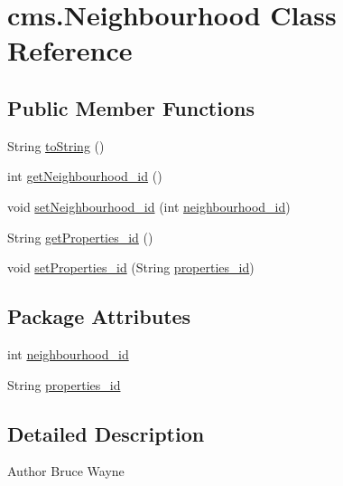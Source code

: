 \hypertarget{classcms_1_1_neighbourhood}{}\section{cms.\+Neighbourhood Class Reference}
\label{classcms_1_1_neighbourhood}
\subsection*{Public Member Functions}
\begin{DoxyCompactItemize}
\item 
String \mbox{\hyperlink{classcms_1_1_neighbourhood_a48841e05711991f412c2a28cb541a9be}{to\+String}} ()
\item 
int \mbox{\hyperlink{classcms_1_1_neighbourhood_a01357608cd45e4bcbe1668bdd25b8fe3}{get\+Neighbourhood\+\_\+id}} ()
\item 
void \mbox{\hyperlink{classcms_1_1_neighbourhood_a5223265e896fc8f18444fdb09cedb640}{set\+Neighbourhood\+\_\+id}} (int \mbox{\hyperlink{classcms_1_1_neighbourhood_a8c177196de739fc0f3f68c3865c6fabf}{neighbourhood\+\_\+id}})
\item 
String \mbox{\hyperlink{classcms_1_1_neighbourhood_a5f6f33753e16ef29d94946ab4e28a39f}{get\+Properties\+\_\+id}} ()
\item 
void \mbox{\hyperlink{classcms_1_1_neighbourhood_add4d2c1d9a99196c916503c8f7c5b509}{set\+Properties\+\_\+id}} (String \mbox{\hyperlink{classcms_1_1_neighbourhood_a0264ef7dc2043131f27221feca29d254}{properties\+\_\+id}})
\end{DoxyCompactItemize}
\subsection*{Package Attributes}
\begin{DoxyCompactItemize}
\item 
int \mbox{\hyperlink{classcms_1_1_neighbourhood_a8c177196de739fc0f3f68c3865c6fabf}{neighbourhood\+\_\+id}}
\item 
String \mbox{\hyperlink{classcms_1_1_neighbourhood_a0264ef7dc2043131f27221feca29d254}{properties\+\_\+id}}
\end{DoxyCompactItemize}


\subsection{Detailed Description}
\begin{DoxyAuthor}{Author}
Bruce Wayne 
\end{DoxyAuthor}


